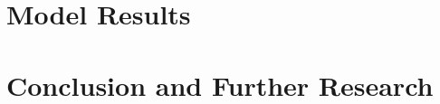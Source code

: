 \documentclass[10pt,a4paper, hidelinks]{article} %
\begin{document}
\section{Model Results}
\lipsum

\section{Conclusion and Further Research}
\lipsum
\end{document}
